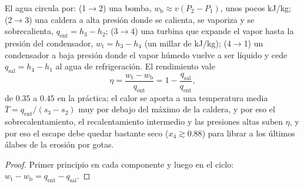 \begin{proposition}\label{prop:b2:open-systems:rankine}
El agua circula por: (1$\to$2) una bomba, $w_{\text{b}} \approx v(P_2 -
P_1)$, unos pocos \unit{kJ/kg}; (2$\to$3) una caldera a alta presión donde se
calienta, se vaporiza y se sobrecalienta, $q_{\text{ent}} = h_3 - h_2$;
(3$\to$4) una turbina que expande el vapor hasta la presión del condensador,
$w_{\text{t}} = h_3 - h_4$ (un millar de \unit{kJ/kg}); (4$\to$1) un condensador
a baja presión donde el vapor húmedo vuelve a ser líquido y cede
$q_{\text{sal}} = h_4 - h_1$ al agua de refrigeración. El rendimiento vale
\[
\eta = \frac{w_{\text{t}} - w_{\text{b}}}{q_{\text{ent}}} = 1 - \frac{q_{\text{sal}}}{q_{\text{ent}}} ,
\]
de $0.35$ a $0.45$ en la práctica; el calor se aporta a una temperatura
media $\bar T = q_{\text{ent}}/(s_3 - s_2)$ muy por debajo del máximo de la
caldera, y por eso el sobrecalentamiento, el recalentamiento intermedio y las presiones altas suben
$\eta$, y por eso el escape debe quedar bastante seco ($x_4 \gtrsim 0.88$) para
librar a los últimos álabes de la erosión por gotas.
\end{proposition}

\begin{proof}
Primer principio en cada componente y luego en el ciclo: $w_{\text{t}} - w_{\text{b}}
= q_{\text{ent}} - q_{\text{sal}}$.
\end{proof}


